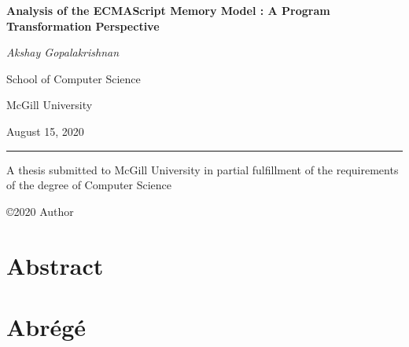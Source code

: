 \documentclass[12pt, TexShade, letterpaper]{report}
\author{\textcopyright Author, August, 2020}
\date{}
\begin{document}
\begin{titlepage}
    \begin{center}
        \vspace*{0.5cm}

        \LARGE
        \textbf{Analysis of the ECMAScript Memory Model : A Program Transformation Perspective}
        
        \vspace{1cm}
        
        \textit{Akshay Gopalakrishnan}
        
        \vspace{7cm}
        
        
        \Large
        School of Computer Science
        
        \vspace{5mm}
        McGill University
        
        \vspace{5mm}
        
        \vspace{5mm}
        August 15, 2020
        \small
        \vspace{0.5cm}
        {\color{red} \hrule height 0.75mm}
        
        \vspace{0.3cm}
        A thesis submitted to McGill University in partial fulfillment of the requirements of the degree of Computer Science
        
        \copyright\hspace{0.5mm}2020 Author
        
    \end{center}
\end{titlepage}

\setlength{\voffset}{2cm}
\renewcommand{\chaptermark}[1]{%
    \markboth{\thechapter.\ #1}{}}
    

    \chapter*{Abstract}
	\label{chap:engAbstract}

\chapter*{Abrégé}
	\label{chap:frAbstract}
\end{document}
